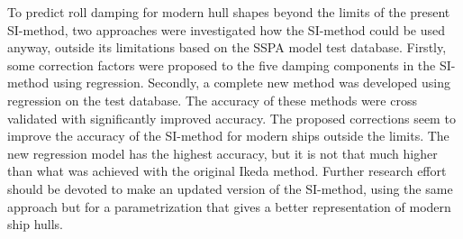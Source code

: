 To predict roll damping for modern hull shapes beyond the limits of the present SI-method, two approaches were investigated how the SI-method could be used anyway, outside its limitations based on the SSPA model test database.
Firstly, some correction factors were proposed to the five damping components in the SI-method using regression. Secondly, a complete new method was developed using regression on the test database. The accuracy of these methods were cross validated with significantly improved accuracy. The proposed corrections seem to improve the accuracy of the SI-method for modern ships outside the limits. The new regression model has the highest accuracy, but it is not that much higher than what was achieved with the original Ikeda method. Further research effort should be devoted to make an updated version of the SI-method, using the same approach but for a parametrization that gives a better representation of modern ship hulls.




